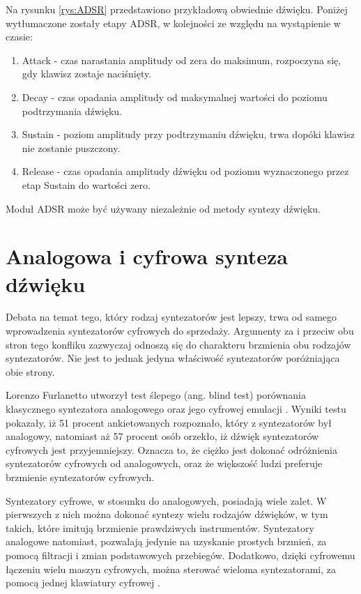 Na rysunku \ref{rys:ADSR} przedstawiono przykładową obwiednie dźwięku. Poniżej wytłumaczone zostały etapy ADSR, w kolejności ze względu na wystąpienie w czasie:
\begin{enumerate}
	\item Attack - czas narastania amplitudy od zera do maksimum, rozpoczyna się, gdy klawisz zostaje naciśnięty.
	
	\item Decay - czas opadania amplitudy od maksymalnej wartości do poziomu podtrzymania dźwięku.
	
	\item Sustain - poziom amplitudy przy podtrzymaniu dźwięku, trwa dopóki klawisz nie zostanie puszczony.
	
	\item Release - czas opadania amplitudy dźwięku od poziomu wyznaczonego przez etap Sustain do wartości zero.
\end{enumerate}
Moduł ADSR może być używany niezależnie od metody syntezy dźwięku.

\section{Analogowa i cyfrowa synteza dźwięku}
Debata na temat tego, który rodzaj syntezatorów jest lepszy, trwa od samego wprowadzenia syntezatorów cyfrowych do sprzedaży. Argumenty za i przeciw obu stron tego konfliku zazwyczaj odnoszą się do charakteru brzmienia obu rodzajów syntezatorów. Nie jest to jednak jedyna właściwość syntezatorów poróżniająca obie strony.

Lorenzo Furlanetto utworzył test ślepego (ang. blind test) porównania klasycznego syntezatora analogowego oraz jego cyfrowej emulacji \cite{synthtopia}. Wyniki testu pokazały, iż 51 procent ankietowanych rozpoznało, który z syntezatorów był analogowy, natomiast aż 57 procent osób orzekło, iż dźwięk syntezatorów cyfrowych jest przyjemniejszy. Oznacza to, że ciężko jest dokonać odróżnienia syntezatorów cyfrowych od analogowych, oraz że większość ludzi preferuje brzmienie syntezatorów cyfrowych.

Syntezatory cyfrowe, w stosunku do analogowych, posiadają wiele zalet. W pierwszych z nich można dokonać syntezy wielu rodzajów dźwięków, w tym takich, które imitują brzmienie prawdziwych instrumentów. Syntezatory analogowe natomiast, pozwalają jedynie na uzyskanie prostych brzmień, za pomocą filtracji i zmian podstawowych przebiegów. Dodatkowo, dzięki cyfrowemu łączeniu wielu maszyn cyfrowych, można sterować wieloma syntezatorami, za pomocą jednej klawiatury cyfrowej \cite{andertons}.

